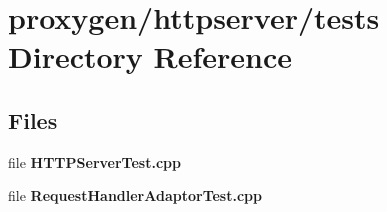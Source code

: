 \section{proxygen/httpserver/tests Directory Reference}
\label{dir_12d920d22ac019ad2abca6e2a76f3349}
\subsection*{Files}
\begin{DoxyCompactItemize}
\item 
file {\bf H\+T\+T\+P\+Server\+Test.\+cpp}
\item 
file {\bf Request\+Handler\+Adaptor\+Test.\+cpp}
\end{DoxyCompactItemize}
